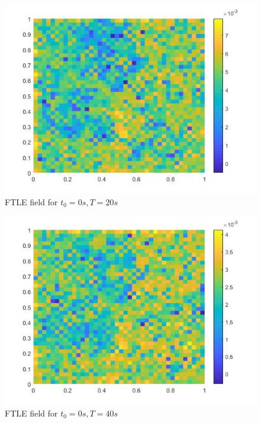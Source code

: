 \begin{figure}
    \centering
    \includegraphics[scale = 0.35]{figures/FTLE_1.jpg}
    \caption{FTLE field for $t_0 = 0s, T = 20s$}
    \label{fig:ftle1}
\end{figure}

\begin{figure}
    \centering
    \includegraphics[scale = 0.35]{figures/FTLE_2.jpg}
    \caption{FTLE field for $t_0 = 0s, T = 40s$}
    \label{fig:ftle2}
\end{figure}


